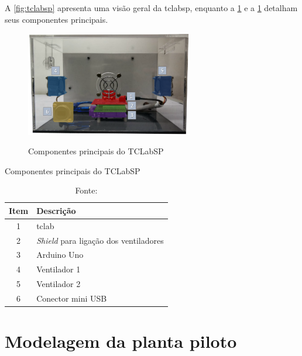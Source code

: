 A \cref{fig:tclabsp} apresenta uma visão geral da \acrshort{tclabsp}, enquanto a \cref{fig:tclabsp_color}
e a \cref{tab:componentes_tclabsp} detalham seus componentes principais.

\begin{figure}[h]
	\caption{Componentes principais do TCLabSP}
	\begin{center}
		\includegraphics[width=0.65\textwidth]{./5_images/TCLabSP_color_numbers.png} 
		\label{fig:tclabsp_color}
	\end{center}
	\centering
\end{figure}

\begin{table}[h]
	\centering
	\caption{Componentes principais do TCLabSP}
	\label{tab:componentes_tclabsp}
	\begin{tabular}{cl} \toprule
		{Item}			& {Descrição} 										\\ \midrule
		1		 		& \acrshort{tclab}	 								\\
		2				& \textit{Shield} para ligação dos ventiladores		\\
		3				& Arduino Uno										\\
		4				& Ventilador 1										\\
		5				& Ventilador 2										\\
		6				& Conector mini USB									\\ \bottomrule
	\end{tabular}
	\caption*{Fonte: }
\end{table}

\section{Modelagem da planta piloto}
\label{sec:modelagem_da_planta_piloto}

